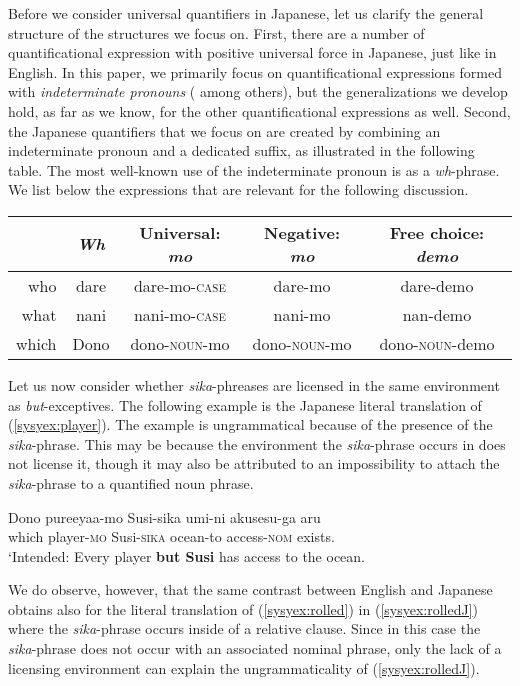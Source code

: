 \documentclass[output=paper,colorlinks,citecolor=brown,
]{langscibook}
\def\refp#1{(\ref{sy#1})}
\def\M#1{\textsc{#1}}
\begin{document}
Before we consider universal quantifiers in Japanese, let us clarify the general structure of the structures we focus on.
First, there are a number of quantificational expression with positive universal force in Japanese, just like in English.
In this paper, we primarily focus on quantificational expressions formed with \emph{indeterminate pronouns}  (\citealt{nishigauchi90, shimoyama06, yatsushiro09b} among others), but the generalizations we develop hold, as far as we know, for the other quantificational expressions as well.
Second, the Japanese quantifiers that we focus on are created by combining an indeterminate pronoun and a dedicated suffix, as  illustrated in the following table.
The most well-known use of the indeterminate pronoun is as a \emph{wh}-phrase. 
We list below the expressions that are relevant for the following discussion.

\begin{center}
  \begin{tabular}{rcccc}
  {} & \emph{Wh} & Universal: \textit{mo} & Negative: \textit{mo} & Free choice: \textit{demo}\\\toprule
  who & dare & dare-mo-\M{case} & dare-mo & dare-demo\\
  what & nani & nani-mo-\M{case} & nani-mo & nan-demo\\
  which & Dono & dono-\M{noun}-mo & dono-\M{noun}-mo & dono-\M{noun}-demo\\
  \end{tabular}
\end{center}

Let us now consider whether \emph{sika}-phreases are licensed in the same environment as \emph{but}-exceptives.
The following example is the Japanese literal translation of \refp{syex:player}.  The example is ungrammatical because of the presence of the  \emph{sika}-phrase.  This may be because the environment the \emph{sika}-phrase occurs in does not license it, though it may also be attributed to an impossibility to attach the \emph{sika}-phrase to a quantified noun phrase.

\ea \gll *Dono pureeyaa-mo Susi-sika umi-ni akusesu-ga aru\\
which player-\M{mo} Susi-\M{sika} ocean-to access-\M{nom} exists.\\
\glt `Intended: Every player \textbf{but Susi} has access to the ocean.\z

We do observe, however, that the same contrast between English and Japanese obtains also for the literal translation of \refp{syex:rolled} in \refp{syex:rolledJ} where the \emph{sika}-phrase occurs inside of a relative clause.
Since in this case the \emph{sika}-phrase does not occur with an associated nominal phrase, only the lack of a licensing environment can explain the ungrammaticality of \refp{syex:rolledJ}.
\end{document}
